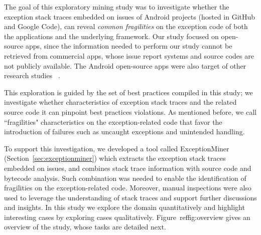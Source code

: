 \documentclass[conference]{IEEEtran}
\begin{document}

The goal of this exploratory mining study was to investigate whether the exception stack traces 
embedded on issues of Android projects (hosted in GitHub and Google Code), can reveal 
\emph{common fragilities} on the exception code of both the applications and the underlying  framework. 
Our study focused on open-source apps, since the information needed to perform our study
cannot be retrieved from commercial apps, whose issue report systems and 
source codes are not publicly available. The Android open-source apps were also 
target of other research studies ~\cite{Linar13,ahimed}.   

This exploration is guided by the set of best practices compiled in this study; we investigate whether characteristics 
of exception stack traces and the related source code it can pinpoint best practices violations. As mentioned before, 
we call  ``fragilities" characteristics on the exception-related code that favor the introduction
of failures such as uncaught exceptions and unintended handling. 

To support this investigation, we developed a tool called ExceptionMiner (Section~\ref{sec:exceptionminer})
which extracts the exception stack traces embedded on issues, 
and combines stack trace information with source code and bytecode 
analysis. Such combination was needed to enable the identification of 
fragilities on the exception-related code. Moreover, manual inspections were also used to leverage
 the understanding of stack traces and support further discussions and insights.
In this study we explore the domain quantitatively and highlight interesting cases by 
exploring cases qualitatively.  Figure~ref{fig:overview} gives an overview of the study, whose tasks are detailed next.
\end{document}
